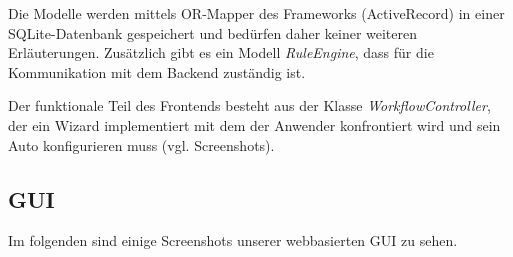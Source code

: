 \documentclass[a4paper,10pt]{article}
\begin{document}
Die Modelle werden mittels OR-Mapper des Frameworks (ActiveRecord) in einer SQLite-Datenbank gespeichert und bedürfen daher keiner weiteren Erläuterungen.
Zusätzlich gibt es ein Modell \textit{RuleEngine}, dass für die Kommunikation mit dem Backend zuständig ist.

Der funktionale Teil des Frontends besteht aus der Klasse \textit{WorkflowController}, der ein Wizard implementiert mit dem der Anwender konfrontiert wird und sein Auto konfigurieren muss (vgl. Screenshots).

\subsection*{GUI}

Im folgenden sind einige Screenshots unserer webbasierten GUI zu sehen.
\end{document}

